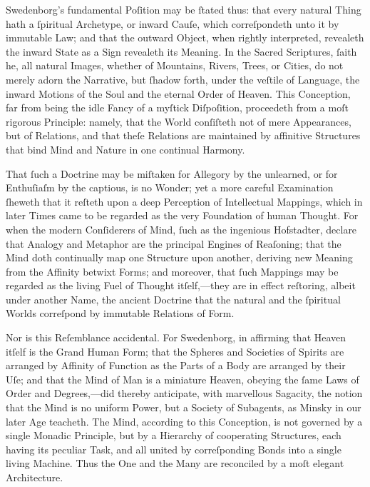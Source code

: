 \documentclass[12pt]{book}
\begin{document}
\noindent
Swedenborg’s fundamental Poſition may be ſtated thus: that every natural Thing hath a ſpiritual Archetype, or inward Cauſe, which correſpondeth unto it by immutable Law; and that the outward Object, when rightly interpreted, revealeth the inward State as a Sign revealeth its Meaning. In the Sacred Scriptures, ſaith he, all natural Images, whether of Mountains, Rivers, Trees, or Cities, do not merely adorn the Narrative, but ſhadow forth, under the veſtile of Language, the inward Motions of the Soul and the eternal Order of Heaven. This Conception, far from being the idle Fancy of a myſtick Diſpoſition, proceedeth from a moſt rigorous Principle: namely, that the World conſiſteth not of mere Appearances, but of Relations, and that theſe Relations are maintained by affinitive Structures that bind Mind and Nature in one continual Harmony.

\vspace{1em}

\noindent
That ſuch a Doctrine may be miſtaken for Allegory by the unlearned, or for Enthuſiaſm by the captious, is no Wonder; yet a more careful Examination ſheweth that it reſteth upon a deep Perception of Intellectual Mappings, which in later Times came to be regarded as the very Foundation of human Thought. For when the modern Conſiderers of Mind, ſuch as the ingenious Hofstadter, declare that Analogy and Metaphor are the principal Engines of Reaſoning; that the Mind doth continually map one Structure upon another, deriving new Meaning from the Affinity betwixt Forms; and moreover, that ſuch Mappings may be regarded as the living Fuel of Thought itſelf,—they are in effect reſtoring, albeit under another Name, the ancient Doctrine that the natural and the ſpiritual Worlds correſpond by immutable Relations of Form.

\vspace{1em}

\noindent
Nor is this Reſemblance accidental. For Swedenborg, in affirming that Heaven itſelf is the Grand Human Form; that the Spheres and Societies of Spirits are arranged by Affinity of Function as the Parts of a Body are arranged by their Uſe; and that the Mind of Man is a miniature Heaven, obeying the ſame Laws of Order and Degrees,—did thereby anticipate, with marvellous Sagacity, the notion that the Mind is no uniform Power, but a Society of Subagents, as Minsky in our later Age teacheth. The Mind, according to this Conception, is not governed by a single Monadic Principle, but by a Hierarchy of cooperating Structures, each having its peculiar Task, and all united by correſponding Bonds into a single living Machine. Thus the One and the Many are reconciled by a moſt elegant Architecture.
\end{document}
